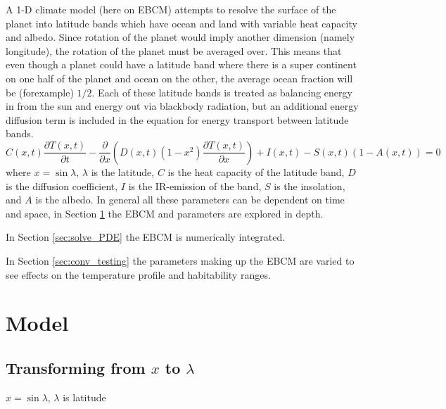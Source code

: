 \documentclass[12pt, onecolumn]{revtex4-2}    %
\begin{document}
A 1-D climate model (here on EBCM) attempts to resolve the surface of the planet into latitude bands which have ocean and land with variable heat capacity and albedo.
Since rotation of the planet would imply another dimension (namely longitude), the rotation of the planet must be averaged over.
This means that even though a planet could have a latitude band where there is a super continent on one half of the planet and ocean on the other, the average ocean fraction will be (forexample) $1/2$.
Each of these latitude bands is treated as balancing energy in from the sun and energy out via blackbody radiation, but an additional energy diffusion term is included in the equation for energy transport between latitude bands.
\begin{equation}
    C(x, t)\frac{\partial T(x, t)}{\partial t} - \frac{\partial}{\partial x} \left(D(x, t)(1-x^2)\frac{\partial T(x, t)}{\partial x}\right) + I(x, t) - S(x, t)(1-A(x, t)) = 0
    \label{eq:PDE_in_x}
\end{equation}
where $x=\sin\lambda$, $\lambda$ is the latitude, $C$ is the heat capacity of the latitude band,
$D$ is the diffusion coefficient, $I$ is the IR-emission of the band,
$S$ is the insolation, and $A$ is the albedo.
In general all these parameters can be dependent on time and space, in Section \ref{sec:model} the EBCM and parameters are explored in depth.

In Section \ref{sec:solve_PDE} the EBCM is numerically integrated.

In Section \ref{sec:conv_testing} the parameters making up the EBCM are varied to see effects on the temperature profile and habitability ranges.

\section{Model} \label{sec:model}

\subsection{Transforming from $x$ to $\lambda$}

$ x = \sin\lambda $, $\lambda$ is latitude
\end{document}
